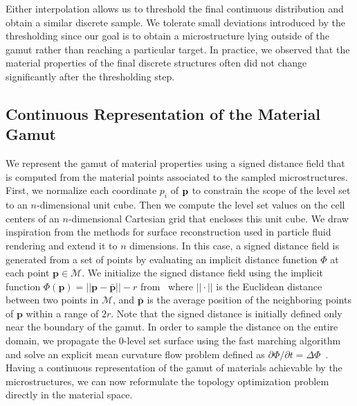 Either interpolation allows us to threshold the final continuous distribution and obtain a similar discrete sample. We tolerate small deviations introduced by the thresholding since our goal is to obtain a microstructure lying outside of the gamut rather than reaching a particular target. In practice, we observed that the material properties of the final discrete structures often did not change significantly after the thresholding step. 

\subsection{Continuous Representation of the Material Gamut }\label{sec:ls}
We represent the gamut of material properties using a signed distance field that is computed from the material points associated to the sampled microstructures.
First, we normalize each coordinate $p_i$ of $\bf p$ to constrain the scope of the level set to an $n$-dimensional unit cube. Then we compute the level set values on the cell centers of an $n$-dimensional Cartesian grid that encloses this unit cube. We draw inspiration from the methods for surface reconstruction used in particle fluid rendering \cite{zhu2005animating,bhatacharya2011level,ando2013highly} and extend it to $n$ dimensions. In this case, a signed distance field is generated from a set of points by evaluating an implicit distance function $\Phi$ at each point $\mathbf{p}\in\mathcal{M}$.
We initialize the signed distance field using the implicit function $\Phi(\mathbf{p})=||\mathbf{p}-\bar{\mathbf{p}}||-r$ from~\citet{zhu2005animating} where $||\cdot||$ is the Euclidean distance between two points in $\mathcal{M}$, and $\bar{\mathbf{p}}$ is the average position of the neighboring points of $\mathbf{p}$ within a range of $2r$.
Note that the signed distance is initially defined only near the boundary of the gamut.
In order to sample the distance on the entire domain, we propagate the 0-level set surface using the fast marching algorithm and solve an explicit mean curvature flow problem defined as $\partial \Phi / \partial t = \Delta \Phi$~\citep{osher2006level}.
Having a continuous representation of the gamut of materials achievable by the microstructures, we can now reformulate the topology optimization problem directly in the material space.
